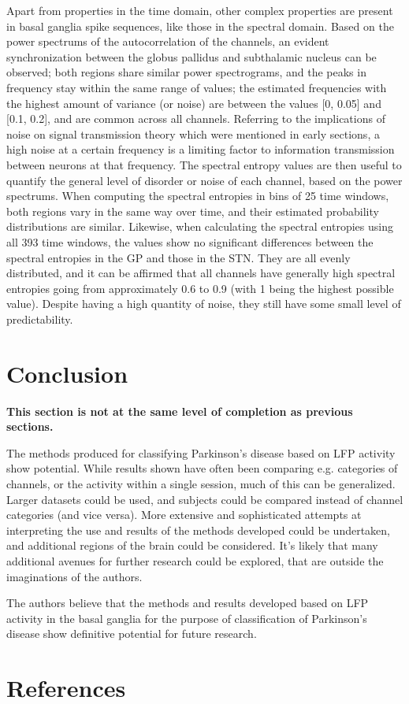 \documentclass{article}
\begin{document}
Apart from properties in the time domain, other complex properties are present in basal ganglia spike sequences, like those in the spectral domain. Based on the power spectrums of the autocorrelation of the channels, an evident synchronization between the globus pallidus and subthalamic nucleus can be observed; both regions share similar power spectrograms, and the peaks in frequency stay within the same range of values; the estimated frequencies with the highest amount of variance (or noise) are between the values [0, 0.05] and [0.1, 0.2], and are common across all channels. Referring to the implications of noise on signal transmission theory which were mentioned in early sections, a high noise at a certain frequency is a limiting factor to information transmission between neurons at that frequency. 
The spectral entropy values are then useful to quantify the general level of disorder or noise of each channel, based on the power spectrums. When computing the spectral entropies in bins of 25 time windows, both regions vary in the same way over time, and their estimated probability distributions are similar. Likewise, when calculating the spectral entropies using all 393 time windows, the values show no significant differences between the spectral entropies in the GP and those in the STN. They are all evenly distributed, and it can be affirmed that all channels have generally high spectral entropies going from approximately 0.6 to 0.9 (with 1 being the highest possible value). Despite having a high quantity of noise, they still have some small level of predictability. 


\newpage
\section{Conclusion}

\textbf{This section is not at the same level of completion as previous sections.}

The methods produced for classifying Parkinson's disease based on LFP activity show potential.
While results shown have often been comparing e.g. categories of channels, or the activity within a single session, much of this can be generalized.
Larger datasets could be used, and subjects could be compared instead of channel categories (and vice versa).
More extensive and sophisticated attempts at interpreting the use and results of the methods developed could be undertaken, and additional regions of the brain could be considered.
It's likely that many additional avenues for further research could be explored, that are outside the imaginations of the authors.

The authors believe that the methods and results developed based on LFP activity in the basal ganglia for the purpose of classification of Parkinson's disease show definitive potential for future research.

\newpage
\section{References}

\end{document}
